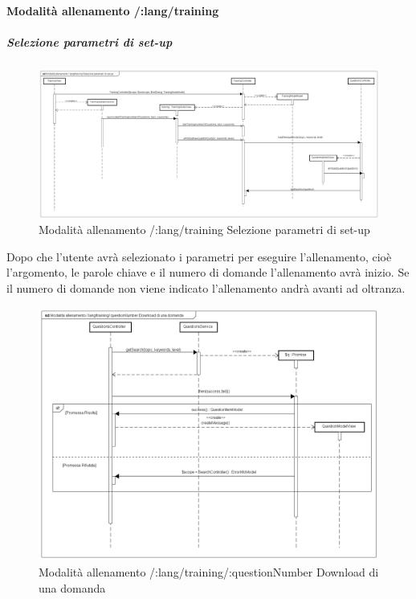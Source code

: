 \paragraph{Modalità allenamento /:lang/training}

\subparagraph{Selezione parametri di set-up}

\label{Modalità allenamento /:lang/training Selezione parametri di set-up}

\begin{figure}[ht]
	\centering
	\includegraphics[scale=0.25,keepaspectratio]{UML/DiagrammiDiSequenza/Front-end/Training_setUp.png}
	\caption{Modalità allenamento /:lang/training Selezione parametri di set-up}
\end{figure} \FloatBarrier

Dopo che l'utente avrà selezionato i parametri per eseguire l'allenamento, cioè l'argomento, le parole chiave e il numero di domande l'allenamento avrà inizio. Se il numero di domande non viene indicato l'allenamento andrà avanti ad oltranza.


\label{Modalità allenamento /:lang/training/:questionNumber Download di una domanda}

\begin{figure}[ht]
	\centering
	\includegraphics[scale=0.25,keepaspectratio]{UML/DiagrammiDiSequenza/Front-end/Training_downloadAquestion.png}
	\caption{Modalità allenamento /:lang/training/:questionNumber Download di una domanda}
\end{figure} \FloatBarrier

